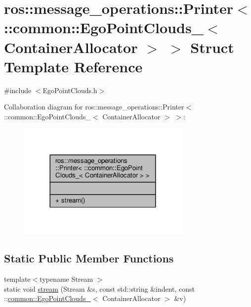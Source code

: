 \hypertarget{structros_1_1message__operations_1_1Printer_3_01_1_1common_1_1EgoPointClouds___3_01ContainerAllocator_01_4_01_4}{}\section{ros\+:\+:message\+\_\+operations\+:\+:Printer$<$ \+:\+:common\+:\+:Ego\+Point\+Clouds\+\_\+$<$ Container\+Allocator $>$ $>$ Struct Template Reference}
\label{structros_1_1message__operations_1_1Printer_3_01_1_1common_1_1EgoPointClouds___3_01ContainerAllocator_01_4_01_4}


{\ttfamily \#include $<$Ego\+Point\+Clouds.\+h$>$}



Collaboration diagram for ros\+:\+:message\+\_\+operations\+:\+:Printer$<$ \+:\+:common\+:\+:Ego\+Point\+Clouds\+\_\+$<$ Container\+Allocator $>$ $>$\+:\nopagebreak
\begin{figure}[H]
\begin{center}
\leavevmode
\includegraphics[width=240pt]{d2/d04/structros_1_1message__operations_1_1Printer_3_01_1_1common_1_1EgoPointClouds___3_01ContainerAllocator_01_4_01_4__coll__graph}
\end{center}
\end{figure}
\subsection*{Static Public Member Functions}
\begin{DoxyCompactItemize}
\item 
{\footnotesize template$<$typename Stream $>$ }\\static void \hyperlink{structros_1_1message__operations_1_1Printer_3_01_1_1common_1_1EgoPointClouds___3_01ContainerAllocator_01_4_01_4_a7715c59d93329b3b8d953ec1dfbb963c}{stream} (Stream \&s, const std\+::string \&indent, const \+::\hyperlink{structcommon_1_1EgoPointClouds__}{common\+::\+Ego\+Point\+Clouds\+\_\+}$<$ Container\+Allocator $>$ \&v)
\end{DoxyCompactItemize}


